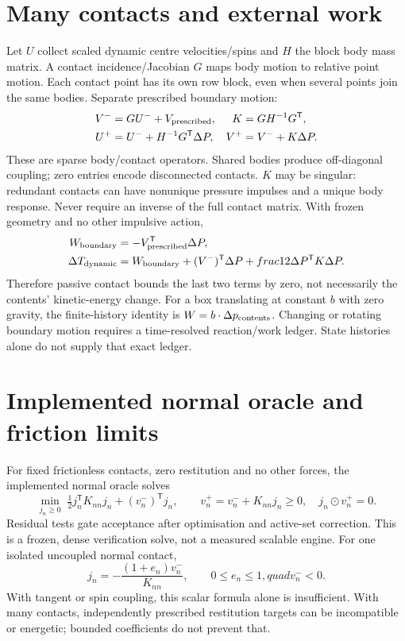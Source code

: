 \documentclass[11pt]{article}
\begin{document}
\section{Many contacts and external work}
Let $U$ collect scaled dynamic centre velocities/spins and $H$ the block body
mass matrix. A contact incidence/Jacobian $G$ maps body motion to relative point
motion. Each contact point has its own row block, even when several points join
the same bodies. Separate prescribed boundary motion:
\begin{align}
 V^- &= G U^-+V_{\rm prescribed}, & K&=G H^{-1}G^{\mathsf T},\\
 U^+ &= U^-+H^{-1}G^{\mathsf T}\Delta P,& V^+&=V^-+K\Delta P.
\end{align}
These are sparse body/contact operators. Shared bodies produce off-diagonal
coupling; zero entries encode disconnected contacts. $K$ may be singular:
redundant contacts can have nonunique pressure impulses and a unique body response.
Never require an inverse of the full contact matrix.
With frozen geometry and no other impulsive action,
\begin{align}
 W_{\rm boundary}&=-V_{\rm prescribed}^{\mathsf T}\Delta P,\\
 \Delta T_{\rm dynamic}&=W_{\rm boundary}
       +(V^-)^{\mathsf T}\Delta P+	frac12\Delta P^{\mathsf T}K\Delta P.
\end{align}
Therefore passive contact bounds the last two terms by zero, not necessarily
the contents' kinetic-energy change. For a box translating at constant $b$ with
zero gravity, the finite-history identity is $W=b\cdot\Delta p_{\rm contents}$.
Changing or rotating boundary motion requires a time-resolved reaction/work
ledger. State histories alone do not supply that exact ledger.

\section{Implemented normal oracle and friction limits}
For fixed frictionless contacts, zero restitution and no other forces, the
implemented normal oracle solves
\begin{equation}
 \min_{j_n\geq0}\;\tfrac12j_n^{\mathsf T}K_{nn}j_n+(v_n^-)^{\mathsf T}j_n,
 \qquad v_n^+=v_n^-+K_{nn}j_n\geq0,\quad j_n\odot v_n^+=0.
\end{equation}
Residual tests gate acceptance after optimisation and active-set correction.
This is a frozen, dense verification solve, not a measured scalable engine.
For one isolated uncoupled normal contact,
\begin{equation}
 j_n=-\frac{(1+e_n)v_n^-}{K_{nn}},\qquad 0\leq e_n\leq1,quad v_n^-<0.
\end{equation}
With tangent or spin coupling, this scalar formula alone is insufficient.
With many contacts, independently prescribed restitution targets can be
incompatible or energetic; bounded coefficients do not prevent that.
\end{document}
